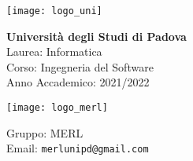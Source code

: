 \begin{minipage}[]{0.3\textwidth}
  \texttt{[image: logo\_uni]}
\end{minipage}
\begin{minipage}[]{0.6\textwidth}
  \textcolor{RossoUnipd}{
    \textbf{Università degli Studi di Padova} \\
    Laurea: Informatica \\
    Corso: Ingegneria del Software \\
    Anno Accademico: 2021/2022
  }
\end{minipage}

\bigskip

\begin{minipage}[]{0.3\textwidth}
  \texttt{[image: logo\_merl]}
\end{minipage}
\begin{minipage}[]{0.6\textwidth}
  Gruppo: MERL \\
  Email: \texttt{merlunipd@gmail.com}
\end{minipage}

\bigskip
\bigskip
\bigskip
